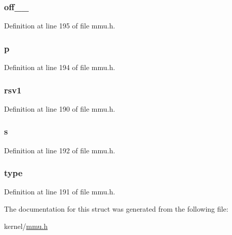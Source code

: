 \hypertarget{structgatedesc_acda895cddc31853ba2be2ca38f9fc106}{
\subsubsection[{off\-\_\-31\-\_\-16}]{ off\-\_\-\_}}\label{structgatedesc_acda895cddc31853ba2be2ca38f9fc106}


Definition at line 195 of file mmu.\-h.

\hypertarget{structgatedesc_afca19e8f7fcc079e05083a7012c34ccf}{
\subsubsection[{p}]{ p}}\label{structgatedesc_afca19e8f7fcc079e05083a7012c34ccf}


Definition at line 194 of file mmu.\-h.

\hypertarget{structgatedesc_a3c18a496ce0a34acbeb84338e3021797}{
\subsubsection[{rsv1}]{ rsv1}}\label{structgatedesc_a3c18a496ce0a34acbeb84338e3021797}


Definition at line 190 of file mmu.\-h.

\hypertarget{structgatedesc_a35181190d39e3d895c0ab657aceabb54}{
\subsubsection[{s}]{ s}}\label{structgatedesc_a35181190d39e3d895c0ab657aceabb54}


Definition at line 192 of file mmu.\-h.

\hypertarget{structgatedesc_a4e4020c6e82bee6562d5bc3c1657cafe}{
\subsubsection[{type}]{ type}}\label{structgatedesc_a4e4020c6e82bee6562d5bc3c1657cafe}


Definition at line 191 of file mmu.\-h.



The documentation for this struct was generated from the following file\-:\begin{DoxyCompactItemize}
\item 
kernel/\hyperlink{mmu_8h}{mmu.\-h}\end{DoxyCompactItemize}
